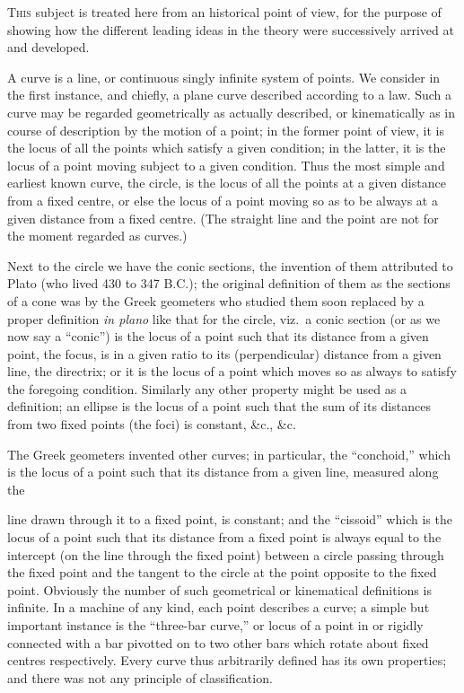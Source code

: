\documentclass[12pt,a4paper,oneside]{book}
\begin{document}
\textsc{This} subject is treated here from an historical point of view, for the purpose of showing how the different leading ideas in the theory were successively arrived at and developed.

A curve is a line, or continuous singly infinite system of points. We consider in the first instance, and chiefly, a plane curve described according to a law. Such a curve may be regarded geometrically as actually described, or kinematically as in course of description by the motion of a point; in the former point of view, it is the locus of all the points which satisfy a given condition; in the latter, it is the locus of a point moving subject to a given condition. Thus the most simple and earliest known curve, the circle, is the locus of all the points at a given distance from a fixed centre, or else the locus of a point moving so as to be always at a given distance from a fixed centre. (The straight line and the point are not for the moment regarded as curves.)

Next to the circle we have the conic sections, the invention of them attributed to Plato (who lived 430 to 347 B.C.); the original definition of them as the sections of a cone was by the Greek geometers who studied them soon replaced by a proper definition \textit{in plano} like that for the circle, viz.\ a conic section (or as we now say a ``conic'') is the locus of a point such that its distance from a given point, the focus, is in a given ratio to its (perpendicular) distance from a given line, the directrix; or it is the locus of a point which moves so as always to satisfy the foregoing condition. Similarly any other property might be used as a definition; an ellipse is the locus of a point such that the sum of its distances from two fixed points (the foci) is constant, \&c., \&c.

The Greek geometers invented other curves; in particular, the ``conchoid,'' which is the locus of a point such that its distance from a given line, measured along the

\newpage
line drawn through it to a fixed point, is constant; and the ``cissoid'' which is the locus of a point such that its distance from a fixed point is always equal to the intercept (on the line through the fixed point) between a circle passing through the fixed point and the tangent to the circle at the point opposite to the fixed point. Obviously the number of such geometrical or kinematical definitions is infinite. In a machine of any kind, each point describes a curve; a simple but important instance is the ``three-bar curve,'' or locus of a point in or rigidly connected with a bar pivotted on to two other bars which rotate about fixed centres respectively. Every curve thus arbitrarily defined has its own properties; and there was not any principle of classification.
\end{document}
